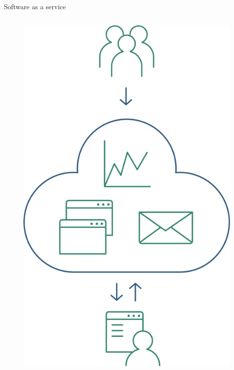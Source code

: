 \documentclass[10pt,xcolor=table ]{beamer}
\begin{document}
\begin{frame}{Software as a service}
\begin{columns}[c,onlytextwidth]
\begin{figure}[H]
			\includegraphics[scale=0.23]{../Figuras/saas}
		\end{figure}
  	\end{columns}
\end{frame}
\end{document}
